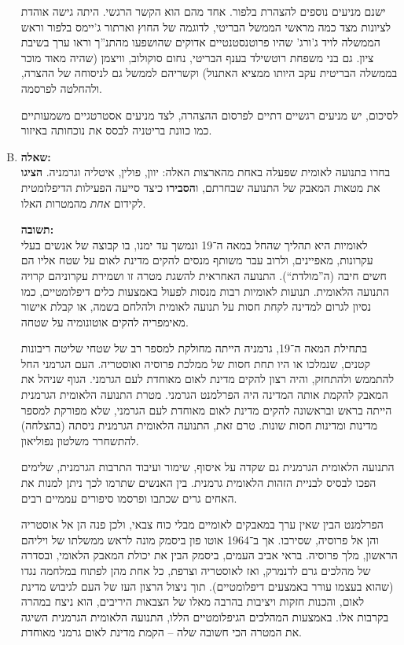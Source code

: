\documentclass[a4paper]{article}
\newcommand\hl[1]   {#1}
\begin{document}
\begin{enumerate}[A.]
			ישנם מניעים נוספים להצהרת בלפור. אחד מהם הוא הקשר הרגשי. היתה גישה אוהדת לציונות מצד כמה מראשי הממשל הבריטי, לדוגמה של החוץ וארתור ג'יימס בלפור וראש הממשלה לויד ג'ורג' שהיו פרוטנסטנטיים אדוקים שהושפעו מהתנ''ך וראו ערך בשיבת ציון. גם בני משפחת רוטשילד בענף הבריטי, נחום סוקולוב, וויצמן (שהיה מאוד מוכר בממשלה הבריטית עקב היותו ממציא האתנול) וקשריהם לממשל גם לניסוחה של ההצרה, ולהחלטה לפרסמה. 
			
			לסיכום, יש מניעים רגשיים דתיים לפרסום ההצהרה, לצד מניעים אסטרטגיים משמעותיים כמו כוונת בריטניה לבסס את נוכחותה באיזור. 
			
			
			\item \textbf{שאלה: }\\
			בחרו בתנועה לאומית שפעלה באחת מהארצות האלה: יוון, פולין, איטליה וגרמניה. \textbf{הציגו} את מטאות המאבק של התנועה שבחרתם, ו\textbf{הסבירו} כיצד סייעה הפעילות הדיפלומטית לקידום \textit{אחת} מהמטרות האלו. 
			
			\textbf{תשובה: }\\
			\hl{לאומיות} היא תהליך שהחל במאה ה־19 ונמשך עד ימנו, בו קבוצה של אנשים בעלי עקרונות, מאפיינים, ולרוב עבר משותף מנסים להקים \hl{מדינת לאום} על שטח אליו הם חשים חיבה (ה''מולדת``). התנועה האחראית להשגת מטרה זו ושמירת עקרוניהם קרויה \hl{התנועה הלאומית}. תנועות לאומיות רבות מנסות לפעול באמצעות כלים דיפלומטיים, כמו נסיון לגרום למדינה לקחת חסות על תנועה לאומית ולהלחם בשמה, או קבלת אישור מאימפריה להקים אוטונומיה על שטחה. 
			
			בתחילת המאה ה־19, גרמניה הייתה מחולקת למספר רב של שטחי שליטה ריבונות קטנים, שנמלכו או היו תחת חסות של ממלכת פרוסיה ואוסטריה. העם הגרמני החל להתממש ולהתחזק, והיה רצון להקים מדינת לאום מאוחדת לעם הגרמני. הגוף שניהל את המאבק להקמת אותה המדינה היה \hl{הפרלמנט הגרמני}. מטרת התנועה הלאומית הגרמנית הייתה בראש ובראשונה להקים מדינת לאום מאוחדת לעם הגרמני, שלא מפורקת למספר מדינות ומדינות חסות שונות. טרם זאת, התנועה הלאומית הגרמנית ניסתה (בהצלחה) להתשחרר משלטון נפוליאון. 
			
			התנועה הלאומית הגרמנית גם שקדה על איסוף, שימור ועיבוד התרבות הגרמנית, שלימים הפכו לבסיס לבניית הזהות הלאומית גרמנית. בין האנשים שתרמו לכך ניתן למנות את \hl{האחים גרים} שכתבו ופרסמו סיפורים עממיים רבים. 
			
			הפרלמנט הבין שאין ערך במאבקים לאומיים מבלי כוח צבאי, ולכן פנה הן אל אוסטריה והן אל פרוסיה, שסירבו. אך ב־1964 \hl{אוטו פון ביסמק} מונה לראש ממשלתו של ויליהם הראשון, מלך פרוסיה. בראי אביב העמים, ביסמק הבין את יכולת המאבק הלאומי, ובסדרה של מהלכים גרם לדנמרק, ואז לאוסטריה וצרפת, כל אחת מהן לפתוח במלחמה נגדו (שהוא בעצמו עורר באמצעים דיפלומטיים). תוך ניצול הרצון העז של העם לגיבוש מדינת לאום, והכנות חזקות ויציבות בהרבה מאלו של הצבאות היריבים, הוא ניצח במהרה בקרבות אלו. באמצעות המהלכים הגיפלומטיים הללו, התנועה הלאומית הגרמנית השיגה את המטרה הכי חשובה שלה – הקמת מדינת לאום גרמני מאוחדת. 
			
		\end{enumerate}
\end{document}
